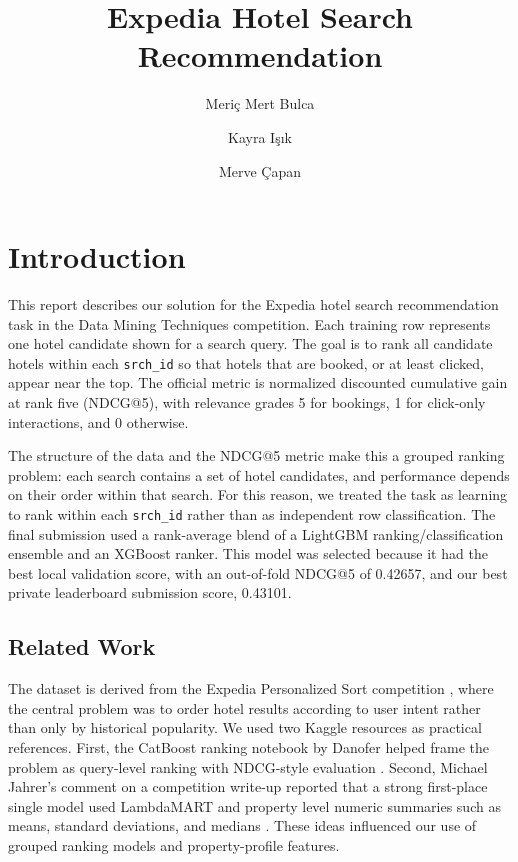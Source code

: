 \documentclass[runningheads]{llncs}
\begin{document}
\title{Expedia Hotel Search Recommendation}

\author{Meri\c{c} Mert Bulca \and Kayra I\c{s}\i{}k \and Merve \c{C}apan}
\maketitle

\section{Introduction}

This report describes our solution for the Expedia hotel search recommendation task in the Data Mining Techniques competition.  Each training row represents one hotel candidate shown for a search query.  The goal is to rank all candidate hotels within each \texttt{srch\_id} so that hotels that are booked, or at least clicked, appear near the top.  The official metric is normalized discounted cumulative gain at rank five (NDCG@5), with relevance grades 5 for bookings, 1 for click-only interactions, and 0 otherwise.

The structure of the data and the NDCG@5 metric make this a grouped ranking problem: each search contains a set of hotel candidates, and performance depends on their order within that search.  For this reason, we treated the task as learning to rank within each \texttt{srch\_id} rather than as independent row classification.  The final submission used a rank-average blend of a LightGBM ranking/classification ensemble and an XGBoost ranker.  This model was selected because it had the best local validation score, with an out-of-fold NDCG@5 of 0.42657, and our best private leaderboard submission score, 0.43101.

\subsection{Related Work}

The dataset is derived from the Expedia Personalized Sort competition \cite{expedia2013}, where the central problem was to order hotel results according to user intent rather than only by historical popularity.  We used two Kaggle resources as practical references.  First, the CatBoost ranking notebook by Danofer helped frame the problem as query-level ranking with NDCG-style evaluation \cite{danofercatboost}.  Second, Michael Jahrer's comment on a competition write-up reported that a strong first-place single model used LambdaMART and property level numeric summaries such as means, standard deviations, and medians \cite{jahrercomment}.  These ideas influenced our use of grouped ranking models and property-profile features.
\end{document}
